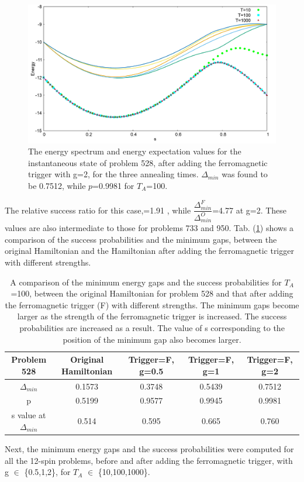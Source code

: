 \documentclass[../main.tex]{subfiles}
\begin{document}
\begin{figure}[H]
\centering 
\includegraphics[scale=0.24]{528_s12_F_g2.png}
\caption{The energy spectrum and energy expectation values for the instantaneous state of problem 528, after adding the ferromagnetic trigger with g=2, for the three annealing times. $\Delta_{min}$ was found to be 0.7512, while $p$=0.9981 for $T_A$=100.}
\label{fig:f9}
\end{figure}
The relative success ratio for this case,=1.91 , while $\dfrac{\Delta_{min}^F}{\Delta_{min}^O}$=4.77 at g=2. These values are also intermediate to those for problems 733 and 950.  Tab. (\ref{tab:f3}) shows a comparison of the success probabilities and the minimum gaps, between the original Hamiltonian and the Hamiltonian after adding the ferromagnetic trigger with different strengths.
\begin{table}[H]
\centering
\renewcommand{\arraystretch}{1.3}
\begin{tabular}{|c|c|c|c|c|}
\hline 
Problem 528 & Original Hamiltonian & Trigger=F, g=0.5 & Trigger=F, g=1 & Trigger=F, g=2 \\ 
\hline 
$\Delta_{min}$ & 0.1573 & 0.3748 & 0.5439 & 0.7512 \\ 
\hline 
p & 0.5199 & 0.9577 & 0.9945 & 0.9981 \\ 
\hline 
s value at $\Delta_{min}$ & 0.514 & 0.595 & 0.665 & 0.760 \\
\hline

\end{tabular} 
\caption{A comparison of the minimum energy gaps and the success probabilities for $T_A$=100, between the original Hamiltonian for problem 528 and that after adding the ferromagnetic trigger (F) with different strengths. The minimum gaps become larger as the strength of the ferromagnetic trigger is increased. The success probabilities are increased as a result. The value of s corresponding to the position of the minimum gap also becomes larger.}
\label{tab:f3}
\end{table}
Next, the minimum energy gaps and the success probabilities were computed for all the 12-spin problems, before and after adding the ferromagnetic trigger, with g $\in$ \{0.5,1,2\}, for $T_A$ $\in$ \{10,100,1000\}. \\
\end{document}
